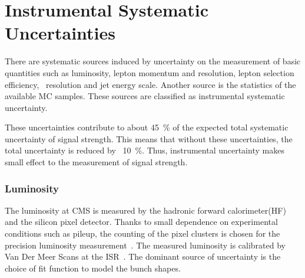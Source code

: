 \section{Instrumental Systematic Uncertainties} 
\label{sec:systinst}

There are systematic sources induced by uncertainty on the measurement 
of basic quantities such as luminosity, lepton momentum and resolution, 
lepton selection efficiency, \met\ resolution and jet energy scale.
Another source is the statistics of the available MC samples.
These sources are classified as instrumental systematic uncertainty. 

These uncertainties contribute to about 45~\% of 
the expected total systematic uncertainty of signal strength. 
This means that without these uncertainties, the total uncertainty is reduced by ~10~\%. 
Thus, instrumental uncertainty makes small effect to the measurement of signal strength.

\subsubsection{Luminosity}

The luminosity at CMS is measured by the hadronic forward calorimeter(HF)
and the silicon pixel detector. Thanks to small dependence on experimental 
conditions such as pileup, the counting of the pixel clusters is chosen 
for the precision luminosity measurement~\cite{CMS-PAS-LUM-13-001}. 
The measured luminosity is calibrated by Van Der Meer Scans at the 
ISR~\cite{CMS-PAS-LUM-13-001}.
The dominant source of uncertainty is the choice of fit function 
to model the bunch shapes.  


